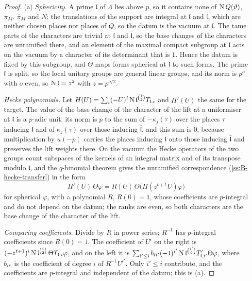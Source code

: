 \begin{proof}
(a) \emph{Sphericity.} A prime $\mathfrak l$ of $\Lambda$ lies above $p$, so it contains none of $\operatorname{N} Q(\vartheta)$, $\pi_M$, $\bar\pi_M$ and $N$; the translations of the support are integral at $\mathfrak l$ and $\bar{\mathfrak l}$, which are neither chosen places nor places of $Q$, so the datum is the vacuum at $\mathfrak l$. The tame parts of the characters are trivial at $\mathfrak l$ and
$\bar{\mathfrak l}$, so the base changes of the characters are unramified there, and an element of the maximal compact subgroup at $\mathfrak l$ acts on the vacuum by a character of its determinant that is $1$. Hence the datum is fixed by this subgroup, and $\Theta$ maps forms spherical at $\mathfrak l$ to such forms. The prime $\mathfrak l$ is split, so the local unitary
groups are general linear groups, and its norm is $p^o$ with $o$ even, so $\operatorname{N}\mathfrak l=z^2$ with $z=p^{o/2}$.

\emph{Hecke polynomials.} Let $H(U)=\sum_i(-U)^i\operatorname{N}\mathfrak l^{\binom i2}T_{\mathfrak l,i}$ and $H'(U)$ the same for the target. The value of the base change of the character of the lift at a uniformiser at $\mathfrak l$ is a $p$-adic unit: its norm is $p$ to the sum of $-\kappa_j(\tau)$ over the places $\tau$ inducing $\mathfrak l$ and of $\kappa_j(\tau)$ over those inducing
$\bar{\mathfrak l}$, and this sum is $0$, because multiplication by $u(-p)$ carries the places inducing $\mathfrak l$ onto those inducing $\bar{\mathfrak l}$ and preserves the lift weights there. On the vacuum the Hecke operators of the two groups count subspaces of the kernels of an integral matrix and of its transpose modulo $\mathfrak l$, and the $q$-binomial theorem
gives the unramified correspondence (\cref{ss:B-hecke-transfer}) in the form
\[
  H'(U)\,\Theta\varphi=R(U)\,\Theta\bigl(H(z^{t+1}U)\varphi\bigr)
\]
for spherical $\varphi$, with a polynomial $R$, $R(0)=1$, whose coefficients are $p$-integral and do not depend on the datum; the ranks are even, so both characters are the base change of the character of the lift.

\emph{Comparing coefficients.} Divide by $R$ in power series; $R^{-1}$ has $p$-integral coefficients since $R(0)=1$. The coefficient of $U^i$ on the right is $(-z^{t+1})^i\operatorname{N}\mathfrak l^{\binom i2}\,\Theta T_{\mathfrak l,i}\varphi$, and on the left it is $\sum_{i'\le i}b_{ii'}(-1)^{i'}\operatorname{N}\mathfrak l^{\binom{i'}2}T'_{\mathfrak l,i'}\Theta\varphi$, where $b_{ii'}$ is the
coefficient of degree $i$ of $R^{-1}U^{i'}$. Only $i'\le i$ contribute, and the coefficients are $p$-integral and independent of the datum; this is (a).


\end{proof}
